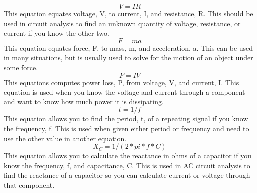 \documentclass[letterpaper, 11pt]{article}
\begin{document}
\begin{equation}
V = IR
\end{equation}
This equation equates voltage, V, to current, I, and resistance, R. This should be used in circuit analysis to find an unknown quantity of voltage, resistance, or current if you know the other two.
\begin{equation}
F = ma
\end{equation}
This equation equates force, F, to mass, m, and acceleration, a. This can be used in many situations, but is usually used to solve for the motion of an object under some force.
\begin{equation}
P = IV
\end{equation}
This equations computes power loss, P, from voltage, V, and current, I. This equation is used when you know the voltage and current through a component and want to know how much power it is dissipating.
\begin{equation}
t = 1/f
\end{equation}
This equation allows you to find the period, t, of a repeating signal if you know the frequency, f. This is used when given either period or frequency and need to use the other value in another equation.
\begin{equation}
X_C = 1/(2*pi*f*C)
\end{equation}
This equation allows you to calculate the reactance in ohms of a capacitor if you know the frequency, f, and capacitance, C. This is used in AC circuit analysis to find the reactance of a capacitor so you can calculate current or voltage through that component.
\end{document}
